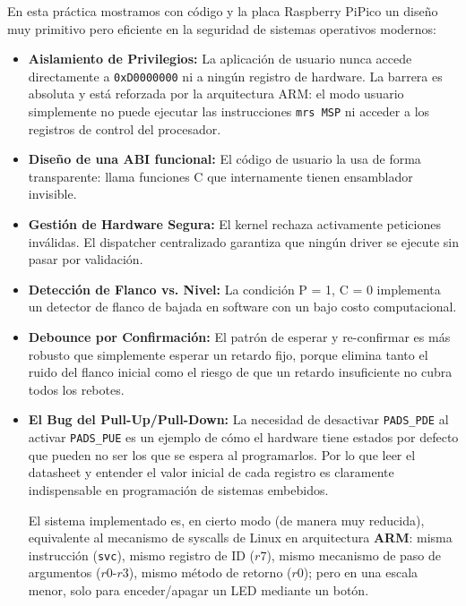 \documentclass[12pt,letterpaper]{article}
\begin{document}
En esta práctica mostramos con código y la placa Raspberry PiPico un diseño muy primitivo pero eficiente en la seguridad de sistemas operativos modernos:
 
\begin{itemize}
\item \textbf{Aislamiento de Privilegios:} La aplicación de usuario nunca accede directamente a \texttt{0xD0000000} ni a ningún registro de hardware. La barrera es absoluta y está reforzada por la arquitectura ARM: el modo usuario simplemente no puede ejecutar las instrucciones \texttt{mrs MSP} ni acceder a los registros de control del procesador.
 
\item \textbf{Diseño de una ABI funcional:} El código de usuario la usa de forma transparente: llama funciones C que internamente tienen ensamblador invisible.
 
\item \textbf{Gestión de Hardware Segura:} El kernel rechaza activamente peticiones inválidas. El dispatcher centralizado garantiza que ningún driver se ejecute sin pasar por validación.
 
\item \textbf{Detección de Flanco vs. Nivel:} La condición P = 1, C = 0 implementa un detector de flanco de bajada en software con un bajo costo computacional.
 
\item \textbf{Debounce por Confirmación:} El patrón de esperar y re-confirmar es más robusto que simplemente esperar un retardo fijo, porque elimina tanto el ruido del flanco inicial como el riesgo de que un retardo insuficiente no cubra todos los rebotes.
 
\item \textbf{El Bug del Pull-Up/Pull-Down:} La necesidad de desactivar \texttt{PADS\_PDE} al activar \texttt{PADS\_PUE} es un ejemplo de cómo el hardware tiene estados por defecto que pueden no ser los que se espera al programarlos. Por lo que leer el datasheet y entender el valor inicial de cada registro es claramente indispensable en programación de sistemas embebidos.
 
  El sistema implementado es, en cierto modo (de manera muy reducida), equivalente al mecanismo de syscalls de Linux en arquitectura \textbf{ARM}: misma instrucción (\texttt{svc}), mismo registro de ID ($r7$), mismo mecanismo de paso de argumentos ($r0$-$r3$), mismo método de retorno ($r0$); pero en una escala menor, solo para enceder/apagar un LED mediante un botón.

\end{itemize}
\end{document}
